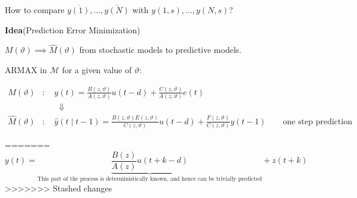
How to compare $\overline{y(1)},\ldots,\overline{y(N)}$ with $y(1,s),\ldots,y(N,s)$?


\textbf{Idea}(Prediction Error Minimization)

$M(\vartheta)\implies \hat{M}(\vartheta)$ from stochastic models to predictive models.

ARMAX in $\mathcal{M}$ for a given value of $\vartheta$:

\begin{align*}
	M(\vartheta)&:\quad y(t)=\frac{B(z, \vartheta)}{A(z, \vartheta)} u(t-d)+\frac{C(z, \vartheta)}{A(z, \vartheta)} e(t)\\
	&\qquad\Downarrow\\
	\hat{M}(\vartheta)&: \quad \hat{y}(t \mid t-1) =\frac{B(z,\vartheta) E(z,\vartheta)}{C(z,\vartheta)} u(t-d)+\frac{F(z,\vartheta)}{C(z,\vartheta)} y(t-1) \qquad \text{one step prediction}
\end{align*}



=======
$$y(t)=\underbrace{\frac{B(z)}{A(z)} u(t+k-d)}_{\text{This part of the process 
		is deterministically 
		known, and hence can 
		be trivially predicted}} +z(t+k)$$
>>>>>>> Stashed changes

